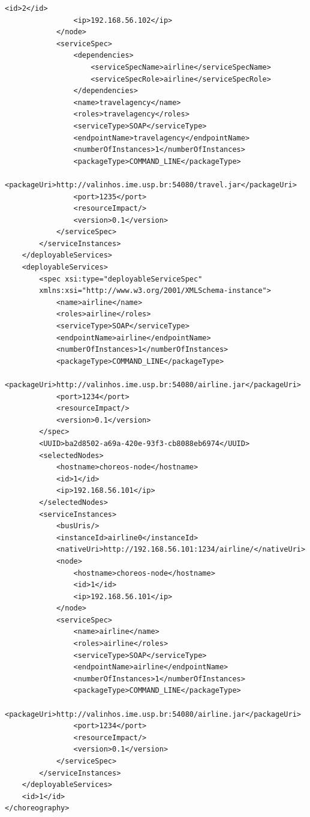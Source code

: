 {\begin{lstlisting}[caption=Choreography XML representation example, label=lst:chor_xml]
                <id>2</id>
                <ip>192.168.56.102</ip>
            </node>
            <serviceSpec>
                <dependencies>
                    <serviceSpecName>airline</serviceSpecName>
                    <serviceSpecRole>airline</serviceSpecRole>
                </dependencies>
                <name>travelagency</name>
                <roles>travelagency</roles>
                <serviceType>SOAP</serviceType>
                <endpointName>travelagency</endpointName>
                <numberOfInstances>1</numberOfInstances>
                <packageType>COMMAND_LINE</packageType>
                <packageUri>http://valinhos.ime.usp.br:54080/travel.jar</packageUri>
                <port>1235</port>
                <resourceImpact/>
                <version>0.1</version>
            </serviceSpec>
        </serviceInstances>
    </deployableServices>
    <deployableServices>
        <spec xsi:type="deployableServiceSpec" 
        xmlns:xsi="http://www.w3.org/2001/XMLSchema-instance">
            <name>airline</name>
            <roles>airline</roles>
            <serviceType>SOAP</serviceType>
            <endpointName>airline</endpointName>
            <numberOfInstances>1</numberOfInstances>
            <packageType>COMMAND_LINE</packageType>
            <packageUri>http://valinhos.ime.usp.br:54080/airline.jar</packageUri>
            <port>1234</port>
            <resourceImpact/>
            <version>0.1</version>
        </spec>
        <UUID>ba2d8502-a69a-420e-93f3-cb8088eb6974</UUID>
        <selectedNodes>
            <hostname>choreos-node</hostname>
            <id>1</id>
            <ip>192.168.56.101</ip>
        </selectedNodes>
        <serviceInstances>
            <busUris/>
            <instanceId>airline0</instanceId>
            <nativeUri>http://192.168.56.101:1234/airline/</nativeUri>
            <node>
                <hostname>choreos-node</hostname>
                <id>1</id>
                <ip>192.168.56.101</ip>
            </node>
            <serviceSpec>
                <name>airline</name>
                <roles>airline</roles>
                <serviceType>SOAP</serviceType>
                <endpointName>airline</endpointName>
                <numberOfInstances>1</numberOfInstances>
                <packageType>COMMAND_LINE</packageType>
                <packageUri>http://valinhos.ime.usp.br:54080/airline.jar</packageUri>
                <port>1234</port>
                <resourceImpact/>
                <version>0.1</version>
            </serviceSpec>
        </serviceInstances>
    </deployableServices>
    <id>1</id>
</choreography>
\end{lstlisting}

}

